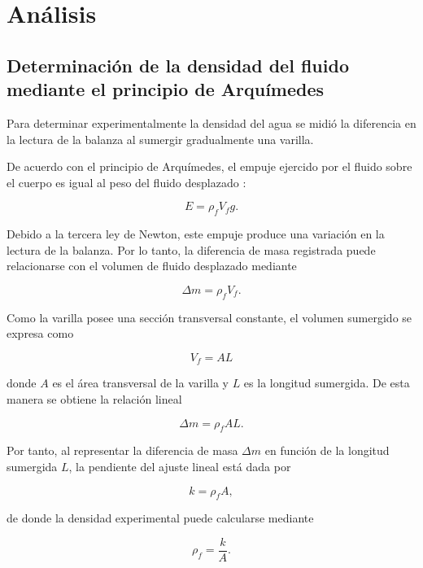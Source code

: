 \section{Análisis}

\subsection{Determinación de la densidad del fluido mediante el principio de Arquímedes}

Para determinar experimentalmente la densidad del agua se midió la diferencia 
en la lectura de la balanza al sumergir gradualmente una varilla. 

De acuerdo con el principio de Arquímedes, el empuje ejercido por el fluido sobre 
el cuerpo es igual al peso del fluido desplazado \cite{young2018}:

\begin{equation}
E = \rho_f V_f g.
\end{equation}

Debido a la tercera ley de Newton, este empuje produce una variación en la lectura de la balanza. 
Por lo tanto, la diferencia de masa registrada puede relacionarse con 
el volumen de fluido desplazado mediante 

\begin{equation}
\Delta m = \rho_f V_f.
\end{equation}

Como la varilla posee una sección transversal constante, el volumen sumergido se expresa como

\begin{equation}
V_f = AL
\end{equation}

donde $A$ es el área transversal de la varilla y $L$ es la longitud sumergida. 
De esta manera se obtiene la relación lineal

\begin{equation}
\Delta m = \rho_f A L.
\end{equation}

Por tanto, al representar la diferencia de masa $\Delta m$ en función de la longitud sumergida $L$, 
la pendiente del ajuste lineal está dada por

\begin{equation}
k = \rho_f A,
\end{equation}

de donde la densidad experimental puede calcularse mediante

\begin{equation}
\rho_f = \frac{k}{A}.
\end{equation}

